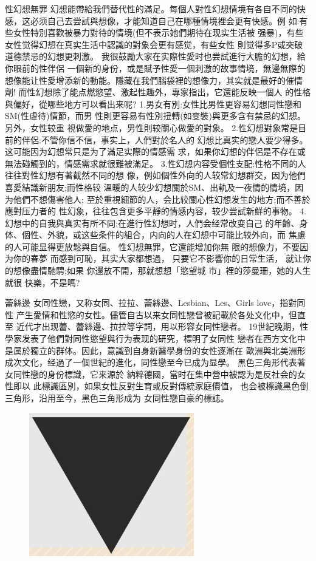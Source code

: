 \documentclass[12pt,UTF8]{ctexbook}
\begin{document}
性幻想無罪
幻想能帶給我們替代性的滿足。每個人對性幻想情境有各自不同的快
感，这必须自己去尝試與想像，才能知道自己在哪種情境裡会更有快感。例
如:有些女性特別喜歡被暴力對待的情境(但不表示她們期待在现实生活被
强暴)，有些女性觉得幻想在真实生活中認識的對象会更有感觉，有些女性
則觉得多P或突破道德禁忌的幻想更刺激。
我很鼓勵大家在实際性愛时也尝試進行大膽的幻想，給你眼前的性伴侶
一個新的身份，或是賦予性愛一個刺激的故事情境，無邊無際的想像能让性愛增添新的動能。隱藏在我們腦袋裡的想像力，其实就是最好的催情劑!
而性幻想除了能点燃慾望、激起性趣外，專家指出，它還能反映一個人
的性格與偏好，從哪些地方可以看出来呢?
1.男女有別:女性比男性更容易幻想同性戀和SM(性虐待)情節，而男
性則更容易有性別扭轉(如变裝)與更多含有禁忌的幻想。另外，女性较重
視做愛的地点，男性則较關心做愛的對象。
2.性幻想對象常是目前的伴侶:不管你信不信，事实上，人們對於名人的
幻想比真实的戀人要少得多。这可能因为幻想常只是为了滿足实際的情感需
求，如果你幻想的伴侶是不存在或無法碰觸到的，情感需求就很難被滿足。
3.性幻想内容受個性支配:性格不同的人往往對性幻想有著截然不同的想
像，例如個性外向的人较常幻想群交，因为他們喜愛結識新朋友;而性格较
溫暖的人较少幻想關於SM、出軌及一夜情的情境，因为他們不想傷害他人;
至於重視細節的人，会比较關心性幻想发生的地方;而不善於應對压力者的
性幻象，往往包含更多平靜的情感内容，较少尝試新鮮的事物。
4.幻想中的自我與真实有所不同:在進行性幻想时，人們会经常改变自己
的年齡、身体、個性、外貌，或这些条件的組合，内向的人在幻想中可能比较外向，而
焦慮的人可能显得更放鬆與自信。
性幻想無罪，它還能增加你無
限的想像力，不要因为你的春夢
而感到可恥，其实大家都想過，
只要它不影響你的日常生活，
就让你的想像盡情馳騁;如果
你還放不開，那就想想「慾望城
市」裡的莎曼珊，她的人生就很
快樂，不是嗎?

蕾絲邊
女同性戀，又称女同、拉拉、蕾絲邊、Lesbian、Les、Girls love，指對同性
产生愛情和性慾的女性。儘管自古以来女同性戀曾被記載於各处文化中，但直至
近代才出现蕾、蕾絲邊、拉拉等字詞，用以形容女同性戀者。
19世紀晚期，性學家发表了他們對同性慾望與行为表现的研究，標明了女同性
戀者在西方文化中是属於獨立的群体。因此，意識到自身新醫學身份的女性逐漸在
歐洲與北美洲形成次文化，经過了一個世紀的進化，同性戀至今已成为显學。
黑色三角形代表著女同性戀的身份標識，它来源於
納粹德國，當时在集中營中被認为是反社会的女性即以
此標識區別，如果女性反對生育或反對傳統家庭價值，
也会被標識黑色倒三角形，沿用至今，黑色三角形成为
女同性戀自豪的標誌。

\begin{figure}[htbp]
	\centering
	\includegraphics[width=0.7\linewidth]{9}
	\caption{}
	\label{fig:1}
\end{figure}
\end{document}
